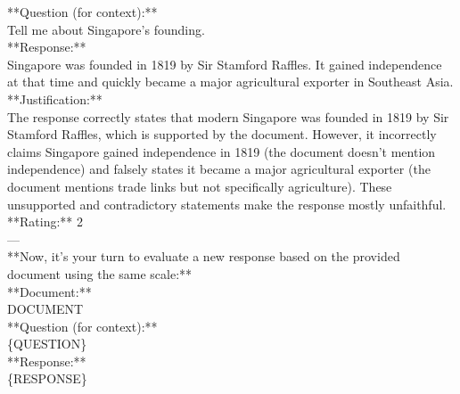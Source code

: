\begin{tcolorbox}
**Question (for context):**\\
Tell me about Singapore's founding.\\
**Response:**\\
Singapore was founded in 1819 by Sir Stamford Raffles. It gained independence at that time and quickly became a major agricultural exporter in Southeast Asia.\\
**Justification:**\\
The response correctly states that modern Singapore was founded in 1819 by Sir Stamford Raffles, which is supported by the document. However, it incorrectly claims Singapore gained independence in 1819 (the document doesn't mention independence) and falsely states it became a major agricultural exporter (the document mentions trade links but not specifically agriculture). These unsupported and contradictory statements make the response mostly unfaithful.\\
**Rating:** 2\\
---\\
**Now, it's your turn to evaluate a new response based on the provided document using the same scale:**\\
**Document:**\\
{DOCUMENT}\\
**Question (for context):**\\
\{QUESTION\}\\
**Response:**\\
\{RESPONSE\}\\

\end{tcolorbox}